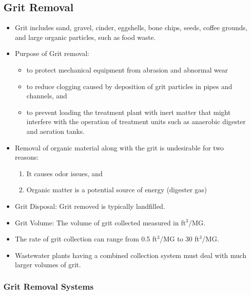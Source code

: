 		\subsection{Grit Removal}
						\begin{itemize}
							\item Grit includes sand, gravel, cinder, eggshells, bone chips, seeds, coffee grounds, and large organic particles, such as food waste.
							\item Purpose of Grit removal:
								\begin{itemize} 
									\item to protect mechanical equipment from abrasion and abnormal wear 
									\item to reduce clogging caused by deposition of grit particles in pipes and channels, and 
				\item to prevent loading the treatment plant with inert matter that might interfere with the operation of treatment units such as anaerobic digester and aeration tanks.
			\end{itemize}
		\item Removal of organic material along with the grit is undesirable for two reasons:
			\begin{enumerate}
				\item It causes odor issues, and 
				\item Organic matter is a potential source of energy (digester gas)
			\end{enumerate}
		\item Grit Disposal: Grit removed is typically landfilled.
		\item Grit Volume:  The volume of grit collected measured in ft$^3$/MG.
		\item The rate of grit collection can range from 0.5 ft$^3$/MG to 30 ft$^3$/MG.
		\item Wastewater plants having a combined collection system must deal with much larger volumes of grit.
\end{itemize}
\subsubsection{Grit Removal Systems}



